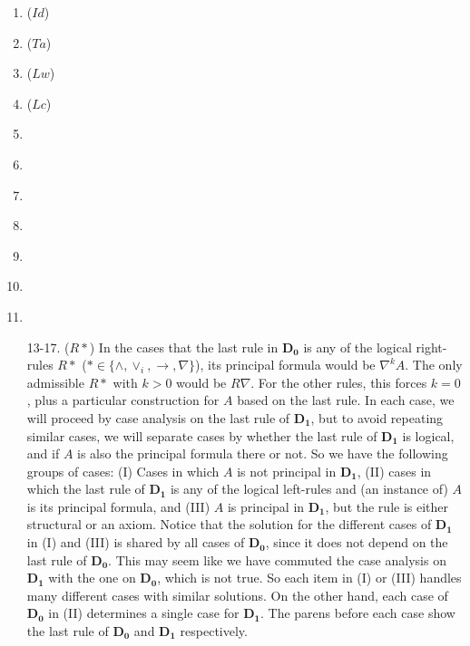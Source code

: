 \begin{enumerate}
	\item ($Id$) \label{c:id-*} 

	\item ($Ta$) \label{c:ta-*} 

	\item ($Lw$) \label{c:lw-*} 

	\item ($Lc$) \label{c:lc-*} 

	\item \label{c:cut-*} 

	\item \label{c:la1-*} 

	\item \label{c:la2-*} 
	
	\item \label{c:lo-*} 
	
	\item \label{c:ln-*} 
	
	\item \label{c:li-*} 
	
	\item \label{c:rw-*} 


	\item[13-17.] ($R*$) In the cases that the last rule in $\mathbf{D_0}$ is any of the logical right-rules $R*$ ($* \in \{ \land, \lor_{i}, \rightarrow, \nabla \}$), its principal formula would be $\nabla^k A$. The only admissible $R*$ with $k > 0$ would be $R\nabla$. For the other rules, this forces $k = 0$, plus a particular construction for $A$ based on the last rule. In each case, we will proceed by case analysis on the last rule of $\mathbf{D_1}$, but to avoid repeating similar cases, we will separate cases by whether the last rule of $\mathbf{D_1}$ is logical, and if $A$ is also the principal formula there or not. So we have the following groups of cases:
	(I) Cases in which $A$ is not principal in $\mathbf{D_1}$,
	(II) cases in which the last rule of $\mathbf{D_1}$ is any of the logical left-rules and (an instance of) $A$ is its principal formula, and (III) $A$ is principal in $\mathbf{D_1}$, but the rule is either structural or an axiom. Notice that the solution for the different cases of $\mathbf{D_1}$ in (I) and (III) is shared by all cases of $\mathbf{D_0}$, since it does not depend on the last rule of $\mathbf{D_0}$. This may seem like we have commuted the case analysis on $\mathbf{D_1}$ with the one on $\mathbf{D_0}$, which is not true. So each item in (I) or (III) handles many different cases with similar solutions.
	On the other hand, each case of $\mathbf{D_0}$ in (II) determines a single case for $\mathbf{D_1}$. The parens before each case show the last rule of $\mathbf{D_0}$ and $\mathbf{D_1}$ respectively.


\end{enumerate}
